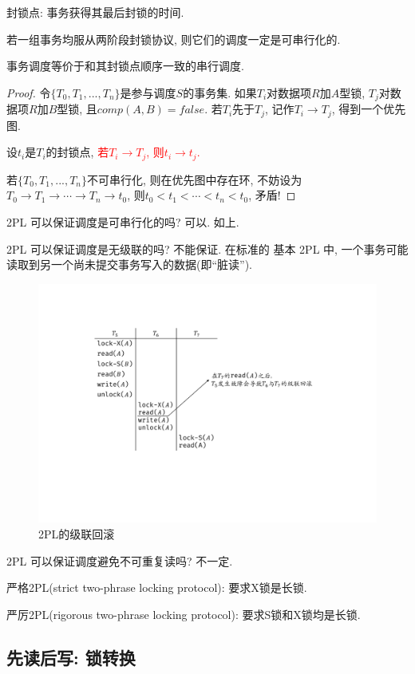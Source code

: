 \begin{definition}[封锁点]
  封锁点: 事务获得其最后封锁的时间.
\end{definition}

\begin{theorem}
  若一组事务均服从两阶段封锁协议, 则它们的调度一定是可串行化的.

  事务调度等价于和其封锁点顺序一致的串行调度.
\end{theorem}

\begin{proof}
  令$\{T_0,T_1,...,T_n\}$是参与调度$S$的事务集. 如果$T_i$对数据项$R$加$A$型锁, $T_j$对数据项$R$加$B$型锁, 且$comp(A,B)=false$. 若$T_i$先于$T_j$, 记作$T_i\to T_j$, 得到一个优先图.

  设$t_i$是$T_i$的封锁点, \textcolor{red}{若$T_i\to T_j$, 则$t_i\to t_j$.}

  若$\{T_0,T_1,...,T_n\}$不可串行化, 则在优先图中存在环, 不妨设为$T_0\to T_1\to \cdots \to T_n \to t_0$, 则$t_0<t_1<\cdots<t_n<t_0$, 矛盾!
\end{proof}

2PL 可以保证调度是可串行化的吗? 可以. 如上.

2PL 可以保证调度是无级联的吗? 不能保证. 在标准的 基本 2PL 中, 一个事务可能读取到另一个尚未提交事务写入的数据(即“脏读”).

\begin{figure}[H]
    \centering
    \includegraphics[width=.7\textwidth]{figure/级联.pdf}
    \caption{2PL的级联回滚}
\end{figure}

2PL 可以保证调度避免不可重复读吗? 不一定. 

严格2PL(strict two-phrase locking protocol): 要求X锁是长锁.

严厉2PL(rigorous two-phrase locking protocol): 要求S锁和X锁均是长锁.

\subsection{先读后写: 锁转换}

